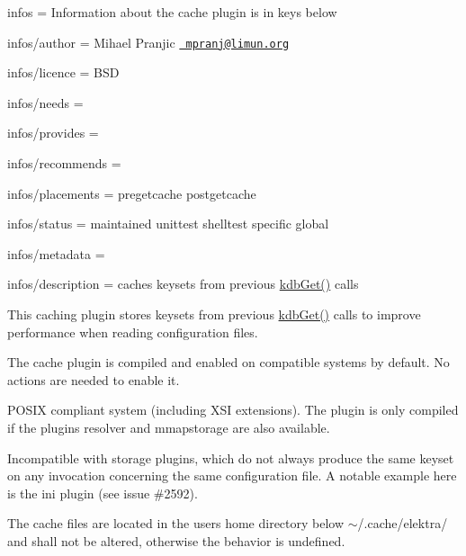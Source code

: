 
\begin{DoxyItemize}
\item infos = Information about the cache plugin is in keys below
\item infos/author = Mihael Pranjic \href{mailto:mpranj@limun.org}{\texttt{ mpranj@limun.\+org}}
\item infos/licence = B\+SD
\item infos/needs =
\item infos/provides =
\item infos/recommends =
\item infos/placements = pregetcache postgetcache
\item infos/status = maintained unittest shelltest specific global
\item infos/metadata =
\item infos/description = caches keysets from previous {\ttfamily \mbox{\hyperlink{group__kdb_ga28e385fd9cb7ccfe0b2f1ed2f62453a1}{kdb\+Get()}}} calls
\end{DoxyItemize}

This caching plugin stores keysets from previous {\ttfamily \mbox{\hyperlink{group__kdb_ga28e385fd9cb7ccfe0b2f1ed2f62453a1}{kdb\+Get()}}} calls to improve performance when reading configuration files.

The cache plugin is compiled and enabled on compatible systems by default. No actions are needed to enable it.

P\+O\+S\+IX compliant system (including X\+SI extensions). The plugin is only compiled if the plugins {\ttfamily resolver} and {\ttfamily mmapstorage} are also available.

Incompatible with storage plugins, which do not always produce the same keyset on any invocation concerning the same configuration file. A notable example here is the {\ttfamily ini} plugin (see issue \#2592).

The cache files are located in the user\textquotesingle{}s home directory below {\ttfamily $\sim$/.cache/elektra/} and shall not be altered, otherwise the behavior is undefined. 